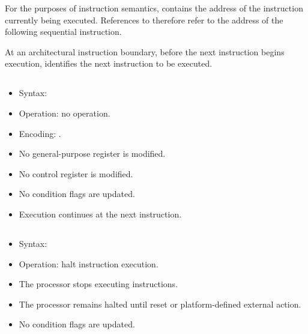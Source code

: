 \noindent
For the purposes of instruction semantics,  contains the address of the instruction
currently being executed. References to  therefore refer to the address of the
following sequential instruction.

At an architectural instruction boundary, before the next instruction begins execution,
 identifies the next instruction to be executed.

\subsection{}

\begin{itemize}
  \item Syntax: 
  \item Operation: no operation.
  \item Encoding: .
  \item No general-purpose register is modified.
  \item No control register is modified.
  \item No condition flags are updated.
  \item Execution continues at the next instruction.
\end{itemize}

\subsection{}

\begin{itemize}
  \item Syntax: 
  \item Operation: halt instruction execution.
  \item The processor stops executing instructions.
  \item The processor remains halted until reset or platform-defined external action.
  \item No condition flags are updated.
\end{itemize}

\subsection{}

